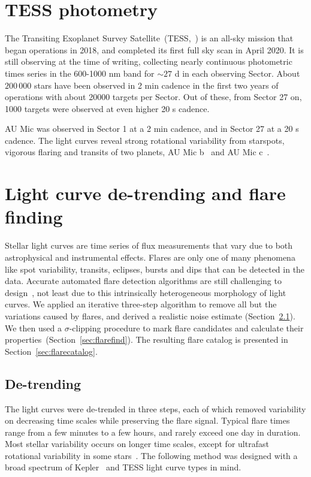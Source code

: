 \documentclass[fleqn,usenatbib]{mnras}%
\begin{document}
\section{TESS photometry}
The Transiting Exoplanet Survey Satellite~(TESS,~\citealt{ricker2014}) is an all-sky mission that began operations in 2018, and completed its first full sky scan in April 2020. It is still observing at the time of writing, collecting nearly continuous photometric times series in the 600-1000 nm band for $\sim 27$ d in each observing Sector. About $200\,000$ stars have been observed in 2 min cadence in the first two years of operations with about 20000 targets per Sector. Out of these, from Sector 27 on, 1000 targets were observed at even higher 20 s cadence.

AU Mic was observed in Sector 1 at a 2 min cadence, and in Sector 27 at a 20 s cadence. The light curves reveal strong rotational variability from starspots, vigorous flaring and transits of two planets, AU Mic b~\citep{plavchan2020,martioli2021new} and AU Mic c~\citep{plavchan2020,martioli2021new}.

\section{Light curve de-trending and flare finding}
\label{sec:detrendfind}
Stellar light curves are time series of flux measurements that vary due to both astrophysical and instrumental effects. Flares are only one of many phenomena like spot variability, transits, eclipses, bursts and dips that can be detected in the data. Accurate automated flare detection algorithms are still challenging to design~\citep{vida2021}, not least due to this intrinsically heterogeneous morphology of light curves. We applied an iterative three-step algorithm to remove all but the variations caused by flares, and derived a realistic noise estimate (Section~\ref{sec:detrend}). We then used a $\sigma$-clipping procedure to mark flare candidates and calculate their properties~(Section~\ref{sec:flarefind}). The resulting flare catalog is presented in Section~\ref{sec:flarecatalog}.

\subsection{De-trending}
\label{sec:detrend}
The light curves were de-trended in three steps, each of which removed variability on decreasing time scales while preserving the flare signal. Typical flare times range from a few minutes to a few hours, and rarely exceed one day in duration. Most stellar variability occurs on longer time scales, except for ultrafast rotational variability in some stars~\citep{ilin2021giant}. The following method was designed with a broad spectrum of Kepler~\citep{borucki2010} and TESS light curve types in mind. %
\end{document}
